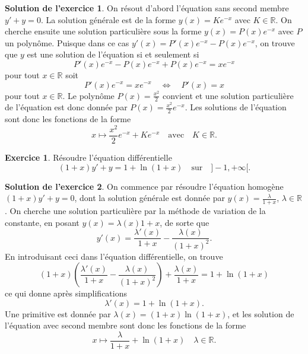 \documentclass[a4paper, 11pt,openany]{article}%
\theoremstyle{plain}
\theoremstyle{definition}
\newtheorem{exo}{Exercice}
\newtheorem{sol}{Solution de l'exercice}
\theoremstyle{remark}
\newcommand{\R}{\mathbb{R}}
\begin{document}
\begin{sol}
On résout d'abord l'équation sans second membre $y'+y=0$. La solution générale est de la forme $y(x)=Ke^{-x}$ avec $K \in \R$. On cherche ensuite une solution particulière sous la forme $y(x) = P(x) e^{-x}$ avec $P$ un polynôme. Puisque dans ce cas $y'(x) = P'(x) e^{-x} - P(x)e^{-x}$, on trouve que $y$ est une solution de l'équation si et seulement si 
\[ P'(x) e^{-x} - P(x)e^{-x} + P(x)e^{-x} = xe^{-x}\]
pour tout $x \in \R$ soit
\[ P'(x) e^{-x} = xe^{-x} \quad \Leftrightarrow \quad P'(x) = x\]
pour tout $x \in \R$. Le polynôme $P(x) = \frac{x^2}{2}$ convient et une solution particulière de l'équation est donc donnée par $P(x) = \frac{x^2}{2} e^{-x}$. Les solutions de l'équation sont donc les fonctions de la forme
\[ x \mapsto \frac{x^2}{2} e^{-x} + Ke^{-x} \quad \text{avec} \quad K\in \R.\]
\end{sol}


\begin{exo}
Résoudre l'équation différentielle
\[ (1+x)y'+y = 1 + \ln(1+x) \quad \text{sur} \quad ]-1, + \infty[.\]
\end{exo}

\begin{sol}
On commence par résoudre l'équation homogène $(1+x)y'+y=0$, dont la solution générale est donnée par $y(x)=\frac{\lambda}{1+x}$, $\lambda \in \R$. On cherche une solution particulière par la méthode de variation de la constante, en posant $y(x)= \lambda(x)1+x$, de sorte que 
\[ y'(x)=\frac{\lambda'(x)}{1+x} - \frac{
\lambda (x)}{(1+x)^2}.\]
En introduisant ceci dans l'équation différentielle, on trouve 
\[ (1+x)\left(\frac{\lambda'(x)}{1+x} - \frac{\lambda(x)}{(1+x)^2} \right)+\frac{\lambda(x)}{1+x} = 1+ \ln(1+x)\]
ce qui donne après simplifications 
\[ \lambda'(x)=1+\ln(1+x).\]
 Une primitive est donnée par $\lambda(x)=(1+x)\ln(1+x)$, et les solution de l'équation avec second membre sont donc les fonctions de la forme
 \[ x \mapsto \frac{\lambda}{1+x} + \ln(1+x) \quad \lambda \in \R.\]
\end{sol}
\end{document}
